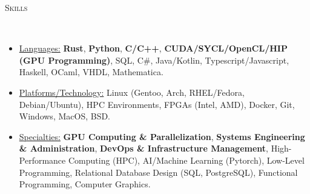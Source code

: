 \documentclass[8pt]{article}
\newenvironment{changemargin}[2]{%
  \begin{list}{}{%
    \setlength{\topsep}{0pt}%
    \setlength{\leftmargin}{#1}%
    \setlength{\rightmargin}{#2}%
    \setlength{\listparindent}{\parindent}%
    \setlength{\itemindent}{\parindent}%
    \setlength{\parsep}{0pt}%
    \setlength{\itemsep}{-2pt}%
  }%
  \item[]}{\end{list}
}
\newcommand{\lineover}{
	\begin{changemargin}{-0.05in}{-0.05in}
		\vspace*{-10pt}
		\hrulefill \\
		\vspace*{-4pt}
	\end{changemargin}
}
\newcommand{\header}[1]{
	\begin{changemargin}{-0.5in}{-0.5in}
		\scshape{#1}\\
  	\lineover
	\end{changemargin}
}
\newenvironment{body} {
	\vspace*{-10pt}
	\begin{changemargin}{-0.25in}{-0.5in}
  }	
	{\end{changemargin}
}
\begin{document}
\smallskip

\header{Skills}
\smallskip
\begin{body}
	\vspace{10pt}
	\begin{itemize} \itemsep -2pt
		\item \uline{Languages:} \textbf{Rust}, \textbf{Python}, \textbf{C/C++},
		\textbf{CUDA/SYCL/OpenCL/HIP (GPU Programming)}, SQL, C\#, Java/Kotlin, Typescript/Javascript,
		Haskell, OCaml, VHDL, Mathematica.
		\item \uline{Platforms/Technology:} Linux (Gentoo, Arch, RHEL/Fedora, Debian/Ubuntu), HPC Environments, FPGAs (Intel, AMD), Docker, Git, Windows, MacOS, BSD.
		\item \uline{Specialties:} \textbf{GPU Computing \& Parallelization}, \textbf{Systems Engineering \& Administration}, \textbf{DevOps \& Infrastructure Management}, High-Performance Computing (HPC), AI/Machine Learning (Pytorch), Low-Level Programming, Relational Database Design (SQL, PostgreSQL), Functional Programming, Computer Graphics.
	\end{itemize}
\end{body}
\end{document}
